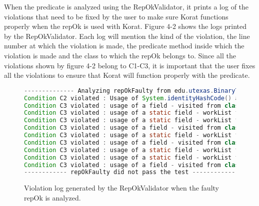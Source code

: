 \par
When the predicate is analyzed using the RepOkValidator, it prints a log of the violations that need to be fixed by the user to make sure Korat functions properly when the repOk is used with Korat. Figure 4-2 shows the logs printed by the RepOkValidator. Each log will mention the kind of the violation, the line number at which the violation is made, the predicate method inside which the violation is made and the class to which the repOk belongs to. Since all the violations shown by figure 4-2 belong to C1-C3, it is important that the user fixes all the violations to ensure that Korat will function properly with the predicate.

\begin{figure}
\centering
\begin{lstlisting}[language=Java]
-------------- Analyzing repOkFaulty from edu.utexas.BinaryTree ------------
Condition C2 violated : Usage of System.identityHashCode() at line 24 inside repOkFaulty in edu.utexas.BinaryTree
Condition C3 violated : usage of a field - visited from class  edu.utexas.Holder at line 27 inside repOkFaulty in edu.utexas.BinaryTree
Condition C3 violated : usage of a static field - workList from class edu.utexas.Holder at line 28 inside repOkFaulty in edu.utexas.BinaryTree
Condition C3 violated : usage of a static field - workList from class edu.utexas.Holder at line 30 inside repOkFaulty in edu.utexas.BinaryTree
Condition C3 violated : usage of a field - visited from class edu.utexas.Holder at line 32 inside repOkFaulty in edu.utexas.BinaryTree
Condition C3 violated : usage of a static field - workList from class edu.utexas.Holder at line 34 inside repOkFaulty in edu.utexas.BinaryTree
Condition C3 violated : usage of a field - visited from class edu.utexas.Holder at line 37 inside repOkFaulty in edu.utexas.BinaryTree
Condition C3 violated : usage of a static field - workList from class edu.utexas.Holder at line 39 inside repOkFaulty in edu.utexas.BinaryTree
Condition C3 violated : usage of a static field - workList from class edu.utexas.Holder at line 29 inside repOkFaulty in edu.utexas.BinaryTree
Condition C3 violated : usage of a field - visited from class edu.utexas.Holder at line 43 inside repOkFaulty in edu.utexas.BinaryTree
------------ repOkFaulty did not pass the test ------------
\end{lstlisting}
\caption{Violation log generated by the RepOkValidator when the faulty repOk is analyzed.}
\label{fig:repOkKoratSatisfyCorrectnessLog}
\end{figure}


